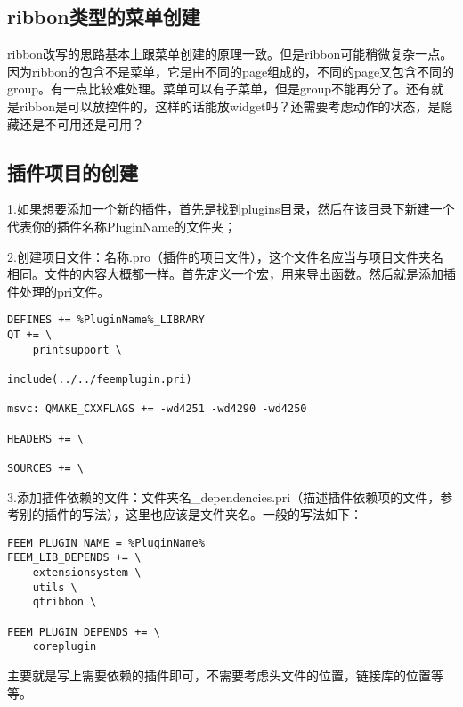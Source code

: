 \subsection{ribbon类型的菜单创建}
ribbon改写的思路基本上跟菜单创建的原理一致。但是ribbon可能稍微复杂一点。因为ribbon的包含不是菜单，它是由不同的page组成的，不同的page又包含不同的group。有一点比较难处理。菜单可以有子菜单，但是group不能再分了。还有就是ribbon是可以放控件的，这样的话能放widget吗？还需要考虑动作的状态，是隐藏还是不可用还是可用？
\subsection{插件项目的创建}
1.如果想要添加一个新的插件，首先是找到plugins目录，然后在该目录下新建一个代表你的插件名称PluginName的文件夹；

2.创建项目文件：名称.pro（插件的项目文件），这个文件名应当与项目文件夹名相同。文件的内容大概都一样。首先定义一个宏，用来导出函数。然后就是添加插件处理的pri文件。
\begin{lstlisting}
DEFINES += %PluginName%_LIBRARY
QT += \
    printsupport \

include(../../feemplugin.pri)

msvc: QMAKE_CXXFLAGS += -wd4251 -wd4290 -wd4250

HEADERS += \

SOURCES += \

\end{lstlisting}

3.添加插件依赖的文件：文件夹名\_dependencies.pri（描述插件依赖项的文件，参考别的插件的写法），这里也应该是文件夹名。一般的写法如下：
\begin{lstlisting}
FEEM_PLUGIN_NAME = %PluginName%
FEEM_LIB_DEPENDS += \
    extensionsystem \
    utils \
    qtribbon \

FEEM_PLUGIN_DEPENDS += \
    coreplugin    
\end{lstlisting}
主要就是写上需要依赖的插件即可，不需要考虑头文件的位置，链接库的位置等等。

